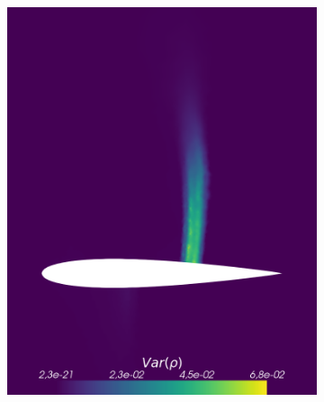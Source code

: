 \begin{figure}[h!]
\begin{subfigure}{0.329\linewidth}
		\includegraphics[width=\linewidth]{figs/Euler1DPlots5/sg_4_9_VarRho.png}
		\label{fig:sub2}
	\end{subfigure}%
	\hfill
	\begin{subfigure}{0.329\linewidth}
		\centering

\end{subfigure}
\end{figure}

